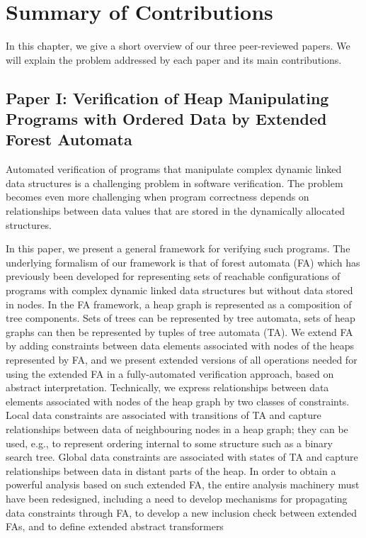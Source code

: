 \chapter{Summary of Contributions}

In this chapter, we give a short overview of our three peer-reviewed papers. We
will explain the problem addressed by each paper and its main contributions.
\section{Paper I: Verification of Heap Manipulating Programs with Ordered Data by Extended Forest Automata} 
Automated verification of programs that manipulate complex dynamic linked data structures is a challenging problem in software verification. The problem becomes even more challenging when program correctness depends on relationships between data values that are stored in the dynamically allocated structures. 

In this paper, we present a general framework for verifying such programs. The underlying formalism of our framework is that
of forest automata (FA) which
has previously been developed for representing sets of reachable configurations of programs with complex dynamic linked data structures but without data stored in nodes. In the FA framework, a heap
graph is represented as a composition of tree components. Sets of trees can be represented by tree automata, sets of heap graphs can then
be represented by tuples of tree automata (TA). We extend FA by adding constraints between data elements associated with nodes of the heaps represented by FA, and we present extended versions of all operations needed for using the extended FA in a fully-automated verification approach, based on abstract interpretation.  
Technically, we express relationships between data elements associated with nodes of the heap graph by two classes of constraints. Local data constraints are associated with transitions of TA and capture relationships between data of neighbouring nodes in a heap graph; they
can be used, e.g., to represent ordering internal to some structure such as a binary search
tree. Global data constraints are associated with states of TA and capture relationships
between data in distant parts of the heap. In order to obtain a powerful analysis based on
such extended FA, the entire analysis machinery must have been redesigned, including
a need to develop mechanisms for propagating data constraints through FA, to develop a new inclusion check between
extended FAs, and to define extended abstract transformers

